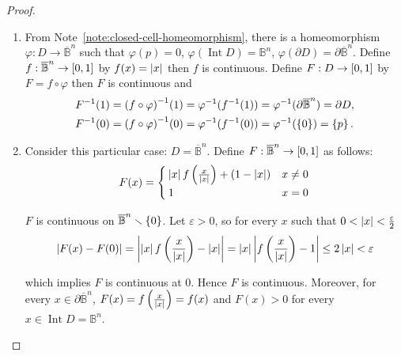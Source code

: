 \begin{proof}
	\begin{enumerate}[label={(\alph*)}]
		\item From Note~\ref{note:closed-cell-homeomorphism}, there is a homeomorphism $\varphi: D \to \overline{\mathbb{B}}^{n}$ such that $\varphi(p) = 0$, $\varphi(\operatorname{Int}D) = \mathbb{B}^{n}$, $\varphi(\partial D) = \partial\overline{\mathbb{B}}^{n}$. Define $f: \overline{\mathbb{B}}^{n} \to \left[{0, 1}\right]$ by $f(x) = \left\vert{x}\right\vert$ then $f$ is continuous. Define $F: D \to \left[{0, 1}\right]$ by $F = f\circ \varphi$ then $F$ is continuous and
		      \begin{align*}
			      F^{-1}(1) & = {(f\circ \varphi)}^{-1}(1) = \varphi^{-1}(f^{-1}(1)) = \varphi^{-1}(\partial\overline{\mathbb{B}}^{n}) = \partial D, \\
			      F^{-1}(0) & = {(f\circ \varphi)}^{-1}(0) = \varphi^{-1}(f^{-1}(0)) = \varphi^{-1}(\left\{{0}\right\}) = \left\{{p}\right\}.
		      \end{align*}
		\item Consider this particular case: $D = \overline{\mathbb{B}}^{n}$. Define $F: \overline{\mathbb{B}}^{n} \to \left[{0, 1}\right]$ as follows:
		      \begin{align*}
			      F(x) = \begin{cases}
				             \left\vert{x}\right\vert f\left(\frac{x}{\left\vert{x}\right\vert}\right) + (1 - \left\vert{x}\right\vert) & x \ne 0 \\
				             1                                                      & x = 0
			             \end{cases}
		      \end{align*}

		      $F$ is continuous on $\overline{\mathbb{B}}^{n}\smallsetminus\left\{{0}\right\}$. Let $\varepsilon > 0$, so for every $x$ such that $0 < \left\vert{x}\right\vert < \frac{\varepsilon}{2}$
		      \begin{align*}
			      \left\vert{F(x) - F(0)}\right\vert = \left\vert{\left\vert{x}\right\vert f\left(\frac{x}{\left\vert{x}\right\vert}\right) - \left\vert{x}\right\vert}\right\vert = \left\vert{x}\right\vert \left\vert{f\left(\frac{x}{\left\vert{x}\right\vert}\right) - 1}\right\vert \leq 2\left\vert{x}\right\vert < \varepsilon
		      \end{align*}

		      which implies $F$ is continuous at 0. Hence $F$ is continuous. Moreover, for every $x \in \partial \overline{\mathbb{B}}^{n}$, $F(x) = f\left(\frac{x}{\left\vert{x}\right\vert}\right) = f(x)$ and $F(x) > 0$ for every $x \in \operatorname{Int} D = \mathbb{B}^{n}$.


\end{enumerate}
\end{proof}
